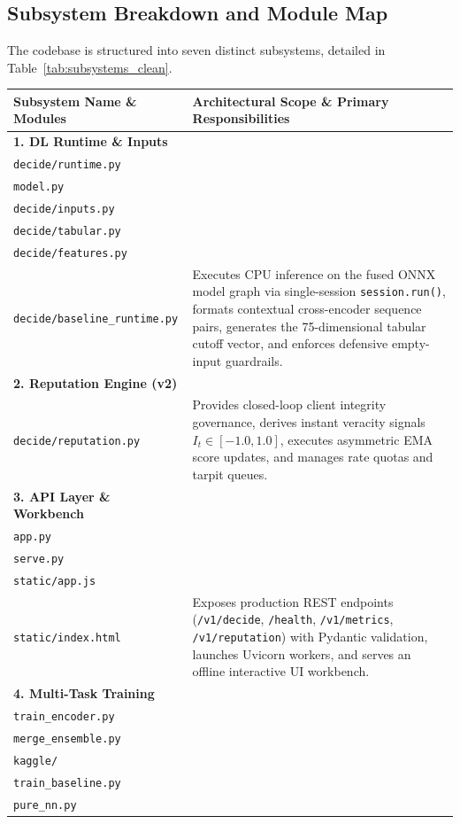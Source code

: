 \documentclass[11pt,a4paper]{article}
\begin{document}
\subsection{Subsystem Breakdown and Module Map}
The codebase is structured into seven distinct subsystems, detailed in Table~\ref{tab:subsystems_clean}.

\begin{table}[htbp]
\centering
\footnotesize
\renewcommand{\arraystretch}{1.15}
\begin{tabularx}{\linewidth}{>{\raggedright\arraybackslash}p{4.6cm} >{\raggedright\arraybackslash}X}
\toprule
\textbf{Subsystem Name \& Modules} & \textbf{Architectural Scope \& Primary Responsibilities} \\
\midrule
\textbf{1. DL Runtime \& Inputs}\\[1pt]
\texttt{decide/runtime.py}\\\texttt{model.py}\\\texttt{decide/inputs.py}\\\texttt{decide/tabular.py}\\\texttt{decide/features.py}\\\texttt{decide/baseline\_runtime.py} &
Executes CPU inference on the fused ONNX model graph via single-session \texttt{session.run()}, formats contextual cross-encoder sequence pairs, generates the 75-dimensional tabular cutoff vector, and enforces defensive empty-input guardrails.\\
\midrule
\textbf{2. Reputation Engine (v2)}\\[1pt]
\texttt{decide/reputation.py} &
Provides closed-loop client integrity governance, derives instant veracity signals $I_t \in [-1.0, 1.0]$, executes asymmetric EMA score updates, and manages rate quotas and tarpit queues.\\
\midrule
\textbf{3. API Layer \& Workbench}\\[1pt]
\texttt{app.py}\\\texttt{serve.py}\\\texttt{static/app.js}\\\texttt{static/index.html} &
Exposes production REST endpoints (\texttt{/v1/decide}, \texttt{/health}, \texttt{/v1/metrics}, \texttt{/v1/reputation}) with Pydantic validation, launches Uvicorn workers, and serves an offline interactive UI workbench.\\
\midrule
\textbf{4. Multi-Task Training}\\[1pt]
\texttt{train\_encoder.py}\\\texttt{merge\_ensemble.py}\\\texttt{kaggle/}\\\texttt{train\_baseline.py}\\\texttt{pure\_nn.py} &

\end{tabularx}
\end{table}
\end{document}
